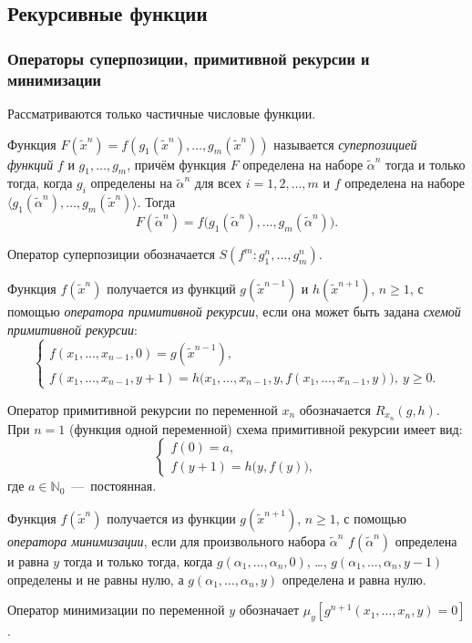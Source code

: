 \subsection{Рекурсивные функции}
\subsubsection{Операторы суперпозиции, примитивной рекурсии и минимизации}
Рассматриваются только частичные числовые функции.
\begin{definition*}
    Функция $F(\widetilde x^n) = f(g_1(\widetilde x^n), \dots, g_m(\widetilde x^n))$ называется \textit{суперпозицией функций} $f$ и $g_1, \dots, g_m$, причём функция $F$ определена на наборе $\widetilde\alpha^n$ тогда и только тогда, когда $g_i$ определены на $\widetilde\alpha^n$ для всех $i = 1, 2, \dots, m$ и $f$ определена на наборе $\langle g_1(\widetilde\alpha^n), \dots, g_m(\widetilde x^n)\rangle$. Тогда
    \[
        F(\widetilde\alpha^n) = f\big(g_1(\widetilde\alpha^n), \dots, g_m(\widetilde\alpha^n)\big).
    \]
\end{definition*}
Оператор суперпозиции обозначается $S(f^m\colon g_1^n, \dots, g_m^n)$.
\begin{definition*}
    Функция $f(\widetilde x^n)$ получается из функций $g(\widetilde x^{n - 1})$ и $h(\widetilde x^{n + 1})$, $n \geqslant 1$, с помощью \textit{оператора примитивной рекурсии}, если она может быть задана \textit{схемой примитивной рекурсии}:
    \[
        \begin{cases}
            f(x_1, \dots, x_{n - 1}, 0) = g(\widetilde x^{n - 1}), \\
            f(x_1, \dots, x_{n - 1}, y + 1) = h\big(x_1, \dots, x_{n - 1}, y, f(x_1, \dots, x_{n - 1}, y)\big),\ y \geqslant 0.
        \end{cases}
    \]
\end{definition*}
Оператор примитивной рекурсии по переменной $x_n$ обозначается $R_{x_n}(g, h)$. \\
При $n = 1$ (функция одной переменной) схема примитивной рекурсии имеет вид:
\[
    \begin{cases}
        f(0) = a, \\
        f(y + 1) = h\big(y, f(y)\big),
    \end{cases}
\]
где $a \in \mathbb{N}_0$~---~постоянная.

\begin{definition*}
    Функция $f(\widetilde x^n)$ получается из функции $g(\widetilde x^{n + 1})$, $n \geqslant 1$, с помощью \textit{оператора минимизации}, если для произвольного набора $\widetilde\alpha^n$ $f(\widetilde\alpha^n)$ определена и равна $y$ тогда и только тогда, когда $g(\alpha_1, \dots, \alpha_n, 0)$, \dots, $g(\alpha_1, \dots, \alpha_n, y - 1)$ определены и не равны нулю, а $g(\alpha_1, \dots, \alpha_n, y)$ определена и равна нулю.
\end{definition*}
Оператор минимизации по переменной $y$ обозначает $\mu_y\!\left[g^{n + 1}(x_1, \dots, x_n, y) = 0\right]$.


